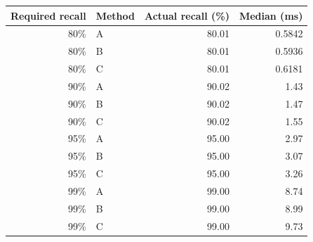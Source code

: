\begin{tabular}{rlrr}
\toprule
Required recall & Method & Actual recall (\%) & Median (ms) \\
\midrule
80\% & A & 80.01 & 0.5842 \\
80\% & B & 80.01 & 0.5936 \\
80\% & C & 80.01 & 0.6181 \\
90\% & A & 90.02 & 1.43 \\
90\% & B & 90.02 & 1.47 \\
90\% & C & 90.02 & 1.55 \\
95\% & A & 95.00 & 2.97 \\
95\% & B & 95.00 & 3.07 \\
95\% & C & 95.00 & 3.26 \\
99\% & A & 99.00 & 8.74 \\
99\% & B & 99.00 & 8.99 \\
99\% & C & 99.00 & 9.73 \\
\bottomrule
\end{tabular}
